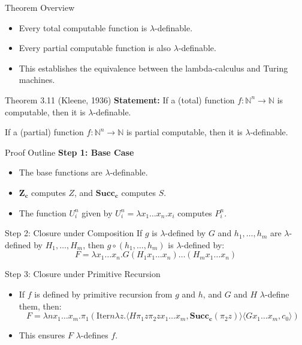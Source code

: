 \documentclass{beamer}
\begin{document}
\begin{frame}{Theorem Overview}
  \begin{itemize}
    \item Every total computable function is \(\lambda\)-definable.
    \item Every partial computable function is also \(\lambda\)-definable.
    \item This establishes the equivalence between the lambda-calculus and Turing machines.
  \end{itemize}
\end{frame}

\begin{frame}{Theorem 3.11 (Kleene, 1936)}
  \textbf{Statement:} If a (total) function $f: \mathbb{N}^n \to \mathbb{N}$ is computable, then it is $\lambda$-definable.
  
  If a (partial) function $f: \mathbb{N}^n \to \mathbb{N}$ is partial computable, then it is $\lambda$-definable.
\end{frame}

\begin{frame}{Proof Outline}
  \textbf{Step 1: Base Case}
  \begin{itemize}
      \item The base functions are $\lambda$-definable.
      \item $\mathbf{Z_c}$ computes $Z$, and $\mathbf{Succ_c}$ computes $S$.
      \item The function $U_i^n$ given by $U_i^n = \lambda x_1 \dots x_n. x_i$ computes $P_i^n$.
  \end{itemize}
\end{frame}

\begin{frame}{Step 2: Closure under Composition}
  If $g$ is $\lambda$-defined by $G$ and $h_1, \dots, h_m$ are $\lambda$-defined by $H_1, \dots, H_m$, then $g \circ (h_1, \dots, h_m)$ is $\lambda$-defined by:
  \[
  F = \lambda x_1 \dots x_n. G(H_1 x_1 \dots x_n) \dots (H_m x_1 \dots x_n)
  \]
\end{frame}

\begin{frame}{Step 3: Closure under Primitive Recursion}
  \begin{itemize}
      \item If $f$ is defined by primitive recursion from $g$ and $h$, and $G$ and $H$ $\lambda$-define them, then:
      \[
      F = \lambda n x_1 \dots x_m. \pi_1 (\text{Iter} n \lambda z. \langle H \pi_1 z \pi_2 z x_1 \dots x_m, \mathbf{Succ_c}(\pi_2 z) \rangle \langle G x_1 \dots x_m, c_0 \rangle)
      \]
      \item This ensures $F$ $\lambda$-defines $f$.
  \end{itemize}
\end{frame}
\end{document}
